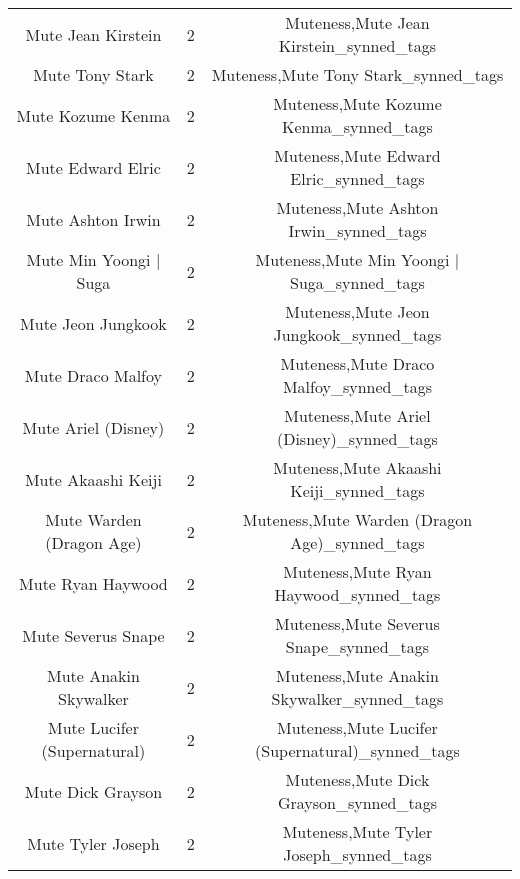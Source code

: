 \begin{table}[h!]
{\begin{tabular}{|c|c|c|}
                                Mute Jean Kirstein &          2 &            Muteness,Mute Jean Kirstein\_synned\_tags \\
                                   Mute Tony Stark &          2 &               Muteness,Mute Tony Stark\_synned\_tags \\
                                 Mute Kozume Kenma &          2 &             Muteness,Mute Kozume Kenma\_synned\_tags \\
                                 Mute Edward Elric &          2 &             Muteness,Mute Edward Elric\_synned\_tags \\
                                 Mute Ashton Irwin &          2 &             Muteness,Mute Ashton Irwin\_synned\_tags \\
                            Mute Min Yoongi | Suga &          2 &        Muteness,Mute Min Yoongi | Suga\_synned\_tags \\
                                Mute Jeon Jungkook &          2 &            Muteness,Mute Jeon Jungkook\_synned\_tags \\
                                 Mute Draco Malfoy &          2 &             Muteness,Mute Draco Malfoy\_synned\_tags \\
                               Mute Ariel (Disney) &          2 &           Muteness,Mute Ariel (Disney)\_synned\_tags \\
                                Mute Akaashi Keiji &          2 &            Muteness,Mute Akaashi Keiji\_synned\_tags \\
                          Mute Warden (Dragon Age) &          2 &      Muteness,Mute Warden (Dragon Age)\_synned\_tags \\
                                 Mute Ryan Haywood &          2 &             Muteness,Mute Ryan Haywood\_synned\_tags \\
                                Mute Severus Snape &          2 &            Muteness,Mute Severus Snape\_synned\_tags \\
                             Mute Anakin Skywalker &          2 &         Muteness,Mute Anakin Skywalker\_synned\_tags \\
                       Mute Lucifer (Supernatural) &          2 &   Muteness,Mute Lucifer (Supernatural)\_synned\_tags \\
                                 Mute Dick Grayson &          2 &             Muteness,Mute Dick Grayson\_synned\_tags \\
                                 Mute Tyler Joseph &          2 &             Muteness,Mute Tyler Joseph\_synned\_tags \\

\end{tabular}}
\end{table}
